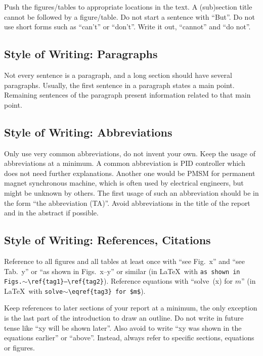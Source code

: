 \documentclass[journal]{IEEEtran}
\begin{document}
Push the figures/tables to appropriate locations in the text. A (sub)section title cannot be followed by a figure/table. Do not start a sentence with “But”. Do not use short forms such as “can't” or “don't”. Write it out, “cannot” and “do not”.

\subsection{Style of Writing: Paragraphs}

Not every sentence is a paragraph, and a long section should have several paragraphs. Usually, the first sentence in a paragraph states a main point. Remaining sentences of the paragraph present information related to that main point.

\subsection{Style of Writing: Abbreviations}

Only use very common abbreviations, do not invent your own. Keep the usage of abbreviations at a minimum. A common abbreviation is PID controller which does not need further explanations. Another one would be PMSM for permanent magnet synchronous machine, which is often used by electrical engineers, but might be unknown by others. The first usage of such an abbreviation should be in the form “the abbreviation (TA)”. Avoid abbreviations in the title of the report and in the abstract if possible.

\subsection{Style of Writing: References, Citations}

Reference to all figures and all tables at least once with “see Fig.~x” and “see Tab.~y” or “as shown in Figs.~x--y” or similar (in \LaTeX\ with \texttt{as shown in Figs.$\sim$\textbackslash{}ref\{tag1\}--\textbackslash{}ref\{tag2\}}). Reference equations with “solve~(x) for $m$” (in \LaTeX\ with \texttt{solve$\sim$\textbackslash{}eqref\{tag3\} for \$m\$}).

Keep references to later sections of your report at a minimum, the only exception is the last part of the introduction to draw an outline. Do not write in future tense like “xy will be shown later”. Also avoid to write “xy was shown in the equations earlier” or “above”. Instead, always refer to specific sections, equations or figures.
\end{document}

